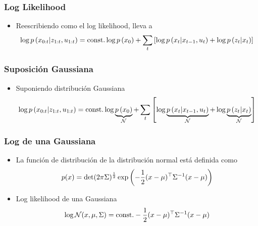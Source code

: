 \begin{frame}
    \frametitle{Log Likelihood}
    
    \begin{itemize}
        \item Reescribiendo como el log likelihood, lleva a
        \begin{equation*}
            \log p\left( x_{0:t} | z_{1:t}, u_{1:t} \right) = \text{const.}  \log p\left( x_{0} \right) + \sum_{t} \left[ \log p\left( x_{t} | x_{t-1}, u_{t} \right) + \log p\left( z_{t} | x_{t} \right) \right]
        \end{equation*}
    \end{itemize}
    
\end{frame}

\begin{frame}
    \frametitle{Suposición Gaussiana}
    
    \begin{itemize}
        \item Suponiendo distribución Gaussiana
        \begin{equation*}
            \log p\left( x_{0:t} | z_{1:t}, u_{1:t} \right) = \text{const.}  \log \underbrace{p\left( x_{0} \right)}_{\mathcal{N}} + \sum_{t} \left[ \log \underbrace{p\left( x_{t} | x_{t-1}, u_{t} \right)}_{\mathcal{N}} + \log \underbrace{p\left( z_{t} | x_{t} \right)}_{\mathcal{N}} \right]
        \end{equation*}
    \end{itemize}
    
\end{frame}

\begin{frame}
    \frametitle{Log de una Gaussiana}

    
    \begin{itemize}
        \item La función de distribución de la distribución normal está definida como
        \begin{equation*}
            p(x)=\det(2\pi\Sigma)^{\frac{1}{2}} \exp\left(-\dfrac{1}{2} (x - \mu )^{\top} {\Sigma}^{-1} (x - \mu )  \right)
        \end{equation*}
        
        \item Log likelihood de una Gaussiana
        \begin{equation*}
            \log \mathcal{N}(x, \mu, \Sigma) =  \text{const.} - \dfrac{1}{2} (x - \mu)^{\top} {\Sigma}^{-1} (x - \mu)
        \end{equation*}
    \end{itemize}
    
\end{frame}

